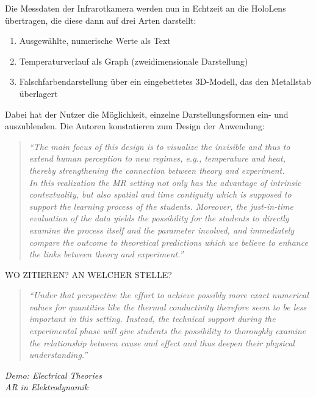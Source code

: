 Die Messdaten der Infrarotkamera werden nun in Echtzeit an die HoloLens übertragen, die diese dann auf drei Arten darstellt:
\begin{enumerate}
	\setlength{\itemsep}{-2pt}
	\item Ausgewählte, numerische Werte als Text
	\item Temperaturverlauf als Graph (zweidimensionale Darstellung)
	\item Falschfarbendarstellung über ein eingebettetes 3D-Modell, das den Metallstab überlagert
\end{enumerate}
Dabei hat der Nutzer die Möglichkeit, einzelne Darstellungsformen ein- und auszublenden. Die Autoren konstatieren zum Design der Anwendung:
\begin{quote}
	\textit{``The main focus of this design is to visualize the invisible and thus to extend human perception to new regimes, e.g., temperature and heat, thereby strengthening the connection between theory and experiment.\\ 
	In this realization the MR setting not only has the advantage of intrinsic contextuality, but also spatial and time contiguity which is supposed to support the learning process of the students. Moreover, the just-in-time evaluation of the data yields the possibility for the students to directly examine the process itself and the parameter involved, and immediately compare the outcome to theoretical predictions which we believe to enhance the links between theory and experiment.''}
\end{quote}
WO ZITIEREN? AN WELCHER STELLE?
\begin{quote}
	\textit{``Under that perspective the effort to achieve possibly more exact numerical values for quantities like the thermal conductivity therefore seem to be less important in this setting. Instead, the technical support during the experimental phase will give students the possibility to thoroughly examine the relationship between cause and effect and thus deepen their physical understanding.''}
\end{quote}

\vspace{4px}
\textit{Demo: Electrical Theories}\\

\vspace{4px}
\textit{AR in Elektrodynamik}\\

